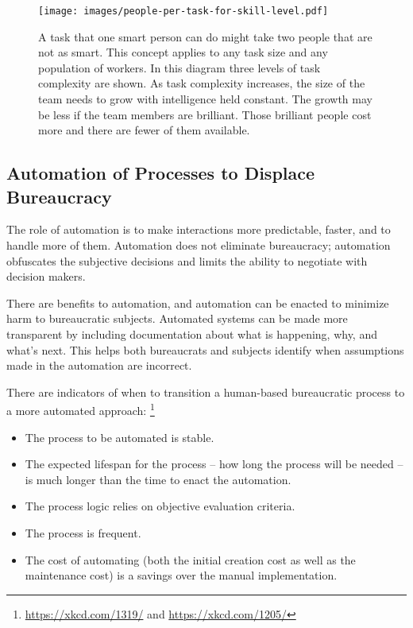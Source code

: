 \begin{figure}
\centering
\texttt{[image: images/people-per-task-for-skill-level.pdf]}
\caption{A task that one smart person can do might take two  people that are not as smart. This concept applies to any task size and any population of workers. In this diagram three levels of task complexity are shown. As task complexity increases, the size of the team needs to grow with intelligence held constant. The growth may be less if the team members are brilliant. Those brilliant people cost more and there are fewer of them available.}
\label{fig:complexity-and-size}
\end{figure}


\subsection*{Automation of Processes to Displace Bureaucracy\label{sec:automation}}

The role of automation is to make interactions more predictable, faster, and to handle more of them. Automation does not eliminate bureaucracy; automation obfuscates the subjective decisions and limits the ability to negotiate with decision makers.

There are benefits to automation, and automation can be enacted to minimize harm to bureaucratic subjects.  Automated systems can be made more transparent by including documentation about what is happening, why, and what's next.
This helps both bureaucrats and subjects identify when assumptions made in the automation are incorrect. 


There are indicators of when to transition a human-based bureaucratic process to a more automated approach:
\footnote{\href{https://xkcd.com/1319/}{https://xkcd.com/1319/} and \href{https://xkcd.com/1205/}{https://xkcd.com/1205/}}
\begin{itemize}
    \item The process to be automated is stable.
    \item The expected lifespan for the process -- how long the process will be needed -- is much longer than the time to enact the automation.
\item The process logic relies on objective evaluation criteria.  
\item The process is frequent.
\item The cost of automating (both the initial creation cost as well as the maintenance cost) is a savings over the manual implementation.
\end{itemize}


